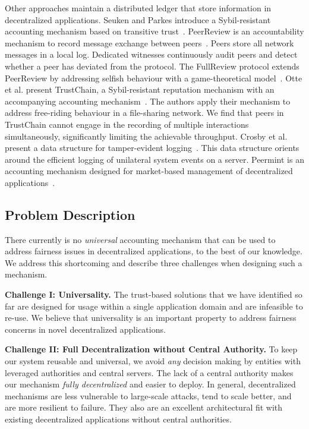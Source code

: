 Other approaches maintain a distributed ledger that store information in decentralized applications.
Seuken and Parkes introduce a Sybil-resistant accounting mechanism based on transitive trust~\cite{seuken2014sybil}.
PeerReview is an accountability mechanism to record message exchange between peers~\cite{haeberlen2007peerreview}.
Peers store all network messages in a local log.
Dedicated witnesses continuously audit peers and detect whether a peer has deviated from the protocol.
The FullReview protocol extends PeerReview by addressing selfish behaviour with a game-theoretical model~\cite{diarra2014fullreview}.
Otte et al. present TrustChain, a Sybil-resistant reputation mechanism with an accompanying accounting mechanism~\cite{otte2017trustchain}.
The authors apply their mechanism to address free-riding behaviour in a file-sharing network.
We find that peers in TrustChain cannot engage in the recording of multiple interactions simultaneously, significantly limiting the achievable throughput.
Crosby et al. present a data structure for tamper-evident logging~\cite{crosby2009efficient}.
This data structure orients around the efficient logging of unilateral system events on a server.
Peermint is an accounting mechanism designed for market-based management of decentralized applications~\cite{hausheer2005peermint}.

\subsection{Problem Description}
\label{sec:problem_description}
There currently is no \emph{universal} accounting mechanism that can be used to address fairness issues in decentralized applications, to the best of our knowledge.
We address this shortcoming and describe three challenges when designing such a mechanism.

\textbf{Challenge I: Universality.}
The trust-based solutions that we have identified so far are designed for usage within a single application domain and are infeasible to re-use.
We believe that universality is an important property to address fairness concerns in novel decentralized applications.

\textbf{Challenge II: Full Decentralization without Central Authority.}
To keep our system reusable and universal, we avoid \emph{any} decision making by entities with leveraged authorities and central servers.
The lack of a central authority makes our mechanism \emph{fully decentralized} and easier to deploy.
In general, decentralized mechanisms are less vulnerable to large-scale attacks, tend to scale better, and are more resilient to failure.
They also are an excellent architectural fit with existing decentralized applications without central authorities.

